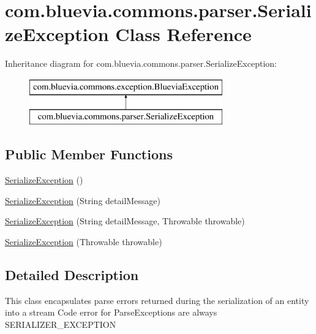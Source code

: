\hypertarget{classcom_1_1bluevia_1_1commons_1_1parser_1_1SerializeException}{
\section{com.bluevia.commons.parser.SerializeException Class Reference}
\label{classcom_1_1bluevia_1_1commons_1_1parser_1_1SerializeException}
}
Inheritance diagram for com.bluevia.commons.parser.SerializeException:\begin{figure}[H]
\begin{center}
\leavevmode
\includegraphics[height=2.000000cm]{classcom_1_1bluevia_1_1commons_1_1parser_1_1SerializeException}
\end{center}
\end{figure}
\subsection*{Public Member Functions}
\begin{DoxyCompactItemize}
\item 
\hyperlink{classcom_1_1bluevia_1_1commons_1_1parser_1_1SerializeException_abd1c71699b561e1f19210d3f89a4546f}{SerializeException} ()
\item 
\hyperlink{classcom_1_1bluevia_1_1commons_1_1parser_1_1SerializeException_aeeb8f75b4b10e4fa6e6d77e2e9863dfa}{SerializeException} (String detailMessage)
\item 
\hyperlink{classcom_1_1bluevia_1_1commons_1_1parser_1_1SerializeException_aa7c5ea36457f30b4f537465df394677c}{SerializeException} (String detailMessage, Throwable throwable)
\item 
\hyperlink{classcom_1_1bluevia_1_1commons_1_1parser_1_1SerializeException_a2cf92d6f848b412cf098a1bbab08efa3}{SerializeException} (Throwable throwable)
\end{DoxyCompactItemize}


\subsection{Detailed Description}
This class encapsulates parse errors returned during the serialization of an entity into a stream Code error for ParseExceptions are always SERIALIZER\_\-EXCEPTION 

